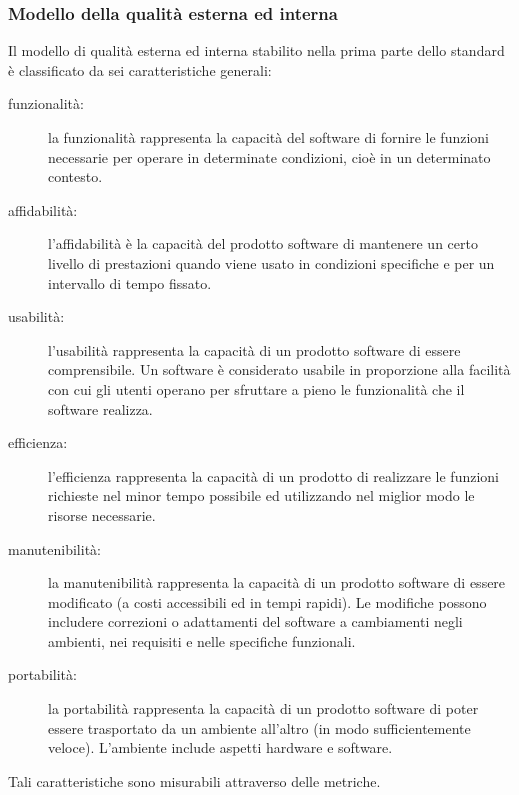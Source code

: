 \documentclass[../PianoDiQualifica.tex]{subfiles}
\begin{document}
\begin{appendices}
		\subsubsection{Modello della qualità esterna ed interna}
		Il modello di qualità esterna ed interna stabilito nella prima parte dello standard è classificato da sei caratteristiche generali:
		\begin{description}
			\item[funzionalità:] la funzionalità rappresenta la capacità del software di fornire le funzioni necessarie per operare in determinate condizioni, cioè in un determinato contesto.
			\item[affidabilità:] l'affidabilità è la capacità del prodotto software di mantenere un certo livello di prestazioni quando viene usato in condizioni specifiche e per un intervallo di tempo fissato.
			\item[usabilità:] l'usabilità rappresenta la capacità di un prodotto software di essere comprensibile. Un software è considerato usabile in proporzione alla facilità con cui gli utenti operano per sfruttare a pieno le funzionalità che il software realizza.
			\item[efficienza:] l'efficienza rappresenta la capacità di un prodotto di realizzare le funzioni richieste nel minor tempo possibile ed utilizzando nel miglior modo le risorse necessarie.
			\item[manutenibilità:] la manutenibilità rappresenta la capacità di un prodotto software di essere modificato (a costi accessibili ed in tempi rapidi). Le modifiche possono includere correzioni o adattamenti del software a cambiamenti negli ambienti, nei requisiti e nelle specifiche funzionali.
			\item[portabilità:] la portabilità rappresenta la capacità di un prodotto software di poter essere trasportato da un ambiente all'altro (in modo sufficientemente veloce). L'ambiente include aspetti hardware e software.
		\end{description}
		Tali caratteristiche sono misurabili attraverso delle metriche.
		

\end{appendices}
\end{document}
